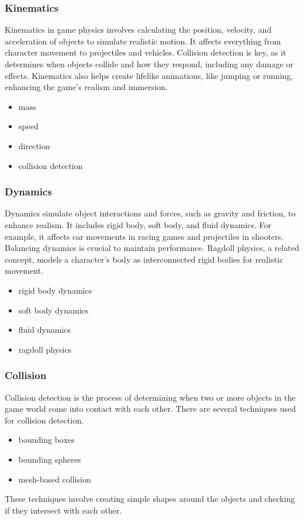 \documentclass{projdoc}
\begin{document}

\subsubsection{Kinematics}
Kinematics in game physics involves calculating the position, velocity, and acceleration of objects to simulate realistic motion. It affects everything from character movement to projectiles and vehicles. Collision detection is key, as it determines when objects collide and how they respond, including any damage or effects. Kinematics also helps create lifelike animations, like jumping or running, enhancing the game's realism and immersion.
\begin{itemize}
	\item mass
	\item speed
	\item direction
	\item collision detection
\end{itemize}


\subsubsection{Dynamics}
Dynamics simulate object interactions and forces, such as gravity and friction, to enhance realism. It includes rigid body, soft body, and fluid dynamics. For example, it affects car movements in racing games and projectiles in shooters. Balancing dynamics is crucial to maintain performance. Ragdoll physics, a related concept, models a character’s body as interconnected rigid bodies for realistic movement.
\begin{itemize}
	\item rigid body dynamics
	\item soft body dynamics
	\item fluid dynamics
	\item ragdoll physics
\end{itemize}


\subsubsection{Collision}
Collision detection is the process of determining when two or more objects in the game world come into contact with each other. There are several techniques used for collision detection.
\begin{itemize}
	\item bounding boxes
	\item bounding spheres
	\item mesh-based collision
\end{itemize}
These techniques involve creating simple shapes around the objects and checking if they intersect with each other.
\end{document}
